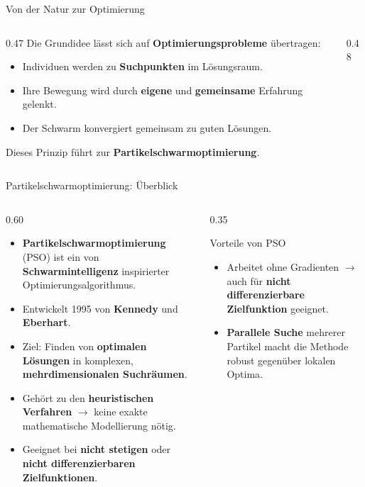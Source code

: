 \begin{frame}{Von der Natur zur Optimierung}
\begin{columns}
\begin{column}{0.47\textwidth}
Die Grundidee lässt sich auf \textbf{Optimierungsprobleme} übertragen:
\begin{itemize}
\item Individuen werden zu \textbf{Suchpunkten} im Lösungsraum.
\item Ihre Bewegung wird durch \textbf{eigene} und \textbf{gemeinsame} Erfahrung gelenkt.
\item Der Schwarm konvergiert gemeinsam zu guten Lösungen.
\end{itemize}
Dieses Prinzip führt zur \textbf{Partikelschwarmoptimierung}.
\end{column}
\begin{column}{0.48\textwidth}
\centering

\end{column}
\end{columns}
\end{frame}

\begin{frame}{Partikelschwarmoptimierung: Überblick}
\begin{columns}
\begin{column}{0.60\textwidth}
\begin{itemize}
\item \textbf{Partikelschwarmoptimierung} (PSO) ist ein von \textbf{Schwarmintelligenz} inspirierter Optimierungsalgorithmus.
\item Entwickelt 1995 von \textbf{Kennedy} und \textbf{Eberhart}.
\item Ziel: Finden von \textbf{optimalen Lösungen} in komplexen, \textbf{mehrdimensionalen Suchräumen}.
\item Gehört zu den \textbf{heuristischen Verfahren} $\rightarrow$ keine exakte mathematische Modellierung nötig.
\item Geeignet bei \textbf{nicht stetigen} oder \textbf{nicht differenzierbaren Zielfunktionen}.
\end{itemize}
\end{column}


\begin{column}{0.35\textwidth}
\begin{block}{Vorteile von PSO}
\begin{itemize}
\item Arbeitet ohne Gradienten $\rightarrow$ auch für \textbf{nicht differenzierbare Zielfunktion} geeignet.
\item \textbf{Parallele Suche} mehrerer Partikel macht die Methode robust gegenüber lokalen Optima.
\end{itemize}
\end{block}
\end{column}
\end{columns}
\end{frame}

